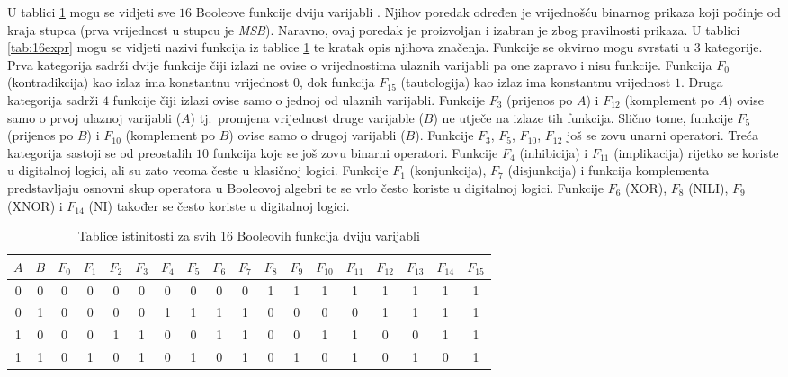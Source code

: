 \documentclass[times, utf8, diplomski]{fer}
\begin{document}
U tablici \ref{tab:16funcs} mogu se vidjeti sve $16$ Booleove funkcije dviju varijabli \cite{book:digital_design}. Njihov poredak određen je vrijednošću binarnog prikaza koji počinje od kraja stupca (prva vrijednost u stupcu je \textit{MSB}). Naravno, ovaj poredak je proizvoljan i izabran je zbog pravilnosti prikaza. U tablici \ref{tab:16expr} mogu se vidjeti nazivi funkcija iz tablice \ref{tab:16funcs} te kratak opis njihova značenja. Funkcije se okvirno mogu svrstati u $3$ kategorije. Prva kategorija sadrži dvije funkcije čiji izlazi ne ovise o vrijednostima ulaznih varijabli pa one zapravo i nisu funkcije. Funkcija $F_{0}$ (kontradikcija) kao izlaz ima konstantnu vrijednost $0$, dok funkcija $F_{15}$ (tautologija) kao izlaz ima konstantnu vrijednost $1$. Druga kategorija sadrži $4$ funkcije čiji izlazi ovise samo o jednoj od ulaznih varijabli. Funkcije $F_{3}$ (prijenos po $A$) i $F_{12}$ (komplement po $A$) ovise samo o prvoj ulaznoj varijabli ($A$) tj.~promjena vrijednost druge varijable ($B$) ne utječe na izlaze tih funkcija. Slično tome, funkcije $F_{5}$ (prijenos po $B$) i $F_{10}$ (komplement po $B$) ovise samo o drugoj varijabli ($B$). Funkcije $F_{3}$, $F_{5}$, $F_{10}$, $F_{12}$ još se zovu unarni operatori. Treća kategorija sastoji se od preostalih $10$ funkcija koje se još zovu binarni operatori. Funkcije $F_{4}$ (inhibicija) i $F_{11}$ (implikacija) rijetko se koriste u digitalnoj logici, ali su zato veoma česte u klasičnoj logici. Funkcije $F_{1}$ (konjunkcija), $F_{7}$ (disjunkcija) i funkcija komplementa predstavljaju osnovni skup operatora u Booleovoj algebri te se vrlo često koriste u digitalnoj logici. Funkcije $F_{6}$ (XOR), $F_{8}$ (NILI), $F_{9}$ (XNOR) i $F_{14}$ (NI) također se često koriste u digitalnoj logici.

\begin{table}[htb]
	\centering
	\caption{Tablice istinitosti za svih 16 Booleovih funkcija dviju varijabli}
	\label{tab:16funcs}
	\begin{tabular}{|cc|cccccccccccccccc|}
		\hline
		$A$ & $B$ & $F_{0}$ & $F_{1}$ & $F_{2}$ & $F_{3}$ & $F_{4}$ & $F_{5}$ & $F_{6}$ & $F_{7}$ & $F_{8}$ & $F_{9}$ & $F_{10}$ & $F_{11}$ & $F_{12}$ & $F_{13}$ & $F_{14}$ & $F_{15}$ \\
		\hline
		0 & 0 & 0 & 0 & 0 & 0 & 0 & 0 & 0 & 0 & 1 & 1 & 1 & 1 & 1 & 1 & 1 & 1 \\
		0 & 1 & 0 & 0 & 0 & 0 & 1 & 1 & 1 & 1 & 0 & 0 & 0 & 0 & 1 & 1 & 1 & 1 \\
		1 & 0 & 0 & 0 & 1 & 1 & 0 & 0 & 1 & 1 & 0 & 0 & 1 & 1 & 0 & 0 & 1 & 1 \\
		1 & 1 & 0 & 1 & 0 & 1 & 0 & 1 & 0 & 1 & 0 & 1 & 0 & 1 & 0 & 1 & 0 & 1 \\
		\hline
	\end{tabular}
\end{table}
\end{document}
